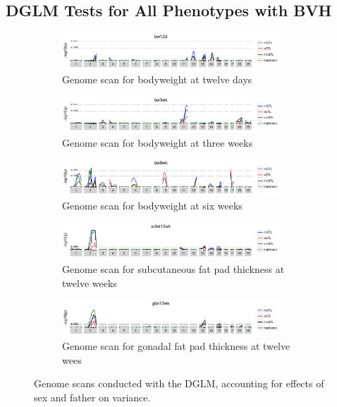 \subsection{DGLM Tests for All Phenotypes with BVH}
  \begin{figure}[h]
    \begin{subfigure}{\linewidth}
      \centering
      \includegraphics[width = 0.9\textwidth]{images/scan_dglm_bw12d.pdf}
      \caption{Genome scan for bodyweight at twelve days}
      \label{fig:bw12d_dglm_scan}
    \end{subfigure}
    \begin{subfigure}{\linewidth}
      \centering
      \includegraphics[width = 0.9\textwidth]{images/scan_dglm_bw3wk.pdf}
      \caption{Genome scan for bodyweight at three weeks}
      \label{fig:bw3wk_dglm_scan}
    \end{subfigure}
    \begin{subfigure}{\linewidth}
      \centering
      \includegraphics[width = 0.9\textwidth]{images/scan_dglm_bw6wk.pdf}
      \caption{Genome scan for bodyweight at six weeks}
      \label{fig:bw6wk_dglm_scan}
    \end{subfigure}
    \begin{subfigure}{\linewidth}
      \centering
      \includegraphics[width = 0.9\textwidth]{images/scan_dglm_scfat12wk.pdf}
      \caption{Genome scan for subcutaneous fat pad thickness at twelve weeks}
      \label{fig:scfat12wk_dglm_scan}
    \end{subfigure}
    \begin{subfigure}{\linewidth}
      \centering
      \includegraphics[width = 0.9\textwidth]{images/scan_dglm_gfat12wk.pdf}
      \caption{Genome scan for gonadal fat pad thickness at twelve wees}
      \label{fig:gfat12wk_dglm_scan}
    \end{subfigure}
    \caption{
      Genome scans conducted with the DGLM, accounting for effects of sex and father on variance.
    }
  \end{figure}

